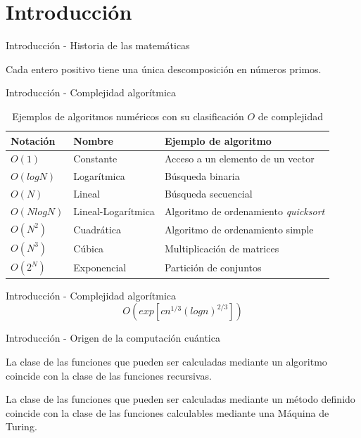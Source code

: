 \section{Introducción}
\begin{frame}{Introducción - Historia de las matemáticas}
\begin{teor}
Cada entero positivo tiene una única descomposición en números primos.
\end{teor}
\end{frame}
\begin{frame}{Introducción - Complejidad algorítmica}
\begin{table}[H]
    \centering
    \begin{tabular}{lll}
        \hline
        Notación & Nombre & Ejemplo de algoritmo \\
        \hline
        $O(1)$ & Constante & Acceso a un elemento de un vector\\ 
        $O(log N)$ & Logarítmica& Búsqueda binaria\\
        $O(N)$ & Lineal & Búsqueda secuencial\\
        $O(N log N)$ & Lineal-Logarítmica& Algoritmo de ordenamiento \textit{quicksort}\\
        $O(N^2)$ &Cuadrática & Algoritmo de ordenamiento simple\\
        $O(N^3)$ &Cúbica & Multiplicación de matrices\\
        $O(2^N)$ &Exponencial & Partición de conjuntos\\ \hline
    \end{tabular}
    \caption{Ejemplos de algoritmos numéricos con su clasificación $O$ de complejidad}
    \label{tabla:notacion-O}
\end{table}
\end{frame}
\begin{frame}{Introducción - Complejidad algorítmica}
\begin{equation}
    O\left(exp\left[c n^{1/3} \left(log n\right)^{2/3} \right] \right)
    \label{eq:O(clasico)}
\end{equation}
\end{frame}
\begin{frame}{Introducción - Origen de la computación cuántica}
\begin{tesis}[de Church]
    La clase de las funciones que pueden ser calculadas mediante un algoritmo coincide con la clase de las funciones recursivas.
\end{tesis}
\begin{tesis}[de Turing]
    La clase de las funciones que pueden ser calculadas mediante un método definido coincide con la clase de las funciones calculables mediante una Máquina de Turing.
\end{tesis}
\end{frame}
